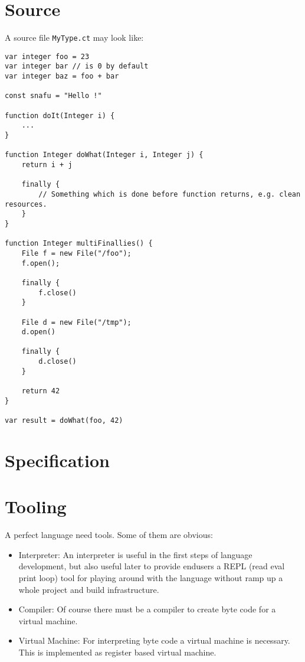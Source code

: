 \documentclass[11pt,a4paper]{report}
\begin{document}
\section{Source}

A source file \texttt{MyType.ct} may look like:

\begin{lstlisting}[language=CayThe]
var integer foo = 23
var integer bar // is 0 by default
var integer baz = foo + bar

const snafu = "Hello !"

function doIt(Integer i) {
    ...
}

function Integer doWhat(Integer i, Integer j) {
    return i + j
    
    finally {
        // Something which is done before function returns, e.g. clean resources.
    }
}

function Integer multiFinallies() {
    File f = new File("/foo");
    f.open();

    finally {
        f.close()
    }

    File d = new File("/tmp");
    d.open()

    finally {
        d.close()
    }

    return 42
}

var result = doWhat(foo, 42)	
\end{lstlisting}

\section{Specification}

\section{Tooling}

A perfect language need tools. Some of them are obvious:

\begin{itemize}
    \item Interpreter: An interpreter is useful in the first steps of language development, but also useful later to provide endusers a REPL (read eval print loop) tool for playing around with the language without ramp up a whole project and build infrastructure.
    \item Compiler: Of course there must be a compiler to create byte code for a virtual machine.
    \item Virtual Machine: For interpreting byte code a virtual machine is necessary. This is implemented as register based virtual machine.
\end{itemize}
\end{document}
